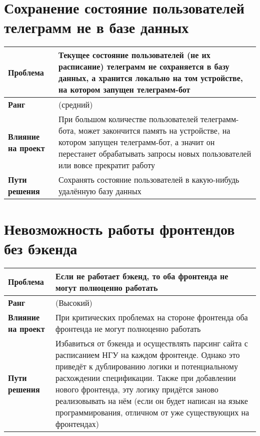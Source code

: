 	\section{Сохранение состояние пользователей телеграмм не в базе данных}
		\begin{tabularx}{\textwidth}{
				| >{\centering\arraybackslash\hsize=4cm}X
				| >{\centering\arraybackslash}X
				|}
			\hline
			\textbf{Проблема} &  Текущее состояние пользователей (не их расписание) телеграмм не сохраняется в базу данных, а хранится локально на том устройстве, на котором запущен телеграмм-бот \\\hline
			\textbf{Ранг} &  5 (средний) \\\hline
			\textbf{Влияние на проект} &  При большом количестве пользователей телеграмм-бота, может закончится память на устройстве, на котором запущен телеграмм-бот, а значит он перестанет обрабатывать запросы новых пользователей или вовсе прекратит работу \\\hline
			\textbf{Пути решения} &  Сохранять состояние пользователей в какую-нибудь удалённую базу данных \\\hline
		\end{tabularx}
	\section{Невозможность работы фронтендов без бэкенда}
		\begin{tabularx}{\textwidth}{
				| >{\centering\arraybackslash\hsize=4cm}X
				| >{\centering\arraybackslash}X
				|}
			\hline
			\textbf{Проблема} &  Если не работает бэкенд, то оба фронтенда не могут полноценно работать \\\hline
			\textbf{Ранг} &  7 (Высокий) \\\hline
			\textbf{Влияние на проект} &  При критических проблемах на стороне фронтенда оба фронтенда не могут полноценно работать \\\hline
			\textbf{Пути решения} &  Избавиться от бэкенда и осуществлять парсинг сайта с расписанием НГУ на каждом фронтенде. Однако это приведёт к дублированию логики и потенциальному расхождении спецификации. Также при добавлении нового фронтенда, эту логику придётся заново реализовывать на нём (если он будет написан на языке программирования, отличном от уже существующих на фронтендах)  \\\hline
		\end{tabularx}
